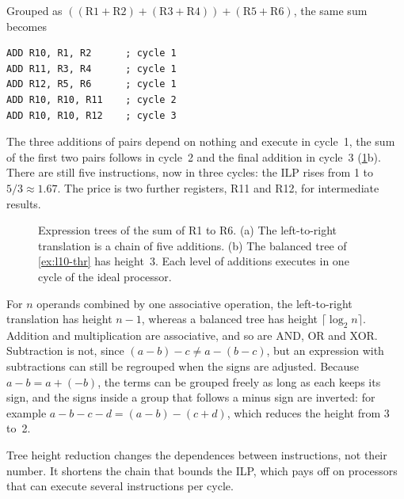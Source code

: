 \documentclass[../main.tex]{subfiles}
\begin{document}
\begin{example}
  \label{ex:l10-thr}
  Grouped as $((\text{R1}+\text{R2}) + (\text{R3}+\text{R4})) +
  (\text{R5}+\text{R6})$, the same sum becomes
  \begin{lstlisting}[language={[x86masm]Assembler}, numbers=none]
ADD R10, R1, R2      ; cycle 1
ADD R11, R3, R4      ; cycle 1
ADD R12, R5, R6      ; cycle 1
ADD R10, R10, R11    ; cycle 2
ADD R10, R10, R12    ; cycle 3
\end{lstlisting}
  The three additions of pairs depend on nothing and execute in cycle~1, the
  sum of the first two pairs follows in cycle~2 and the final addition in
  cycle~3 (\cref{fig:l10-tree-height}b).  There are still five instructions,
  now in three cycles: the ILP rises from 1 to $5/3 \approx 1.67$.  The price
  is two further registers, R11 and R12, for intermediate
  results.
\end{example}

\begin{figure}[htbp]
  \centering
  
  \caption{Expression trees of the sum of R1 to R6.  (a) The left-to-right
    translation is a chain of five additions.  (b) The balanced tree of
    \cref{ex:l10-thr} has height~3.  Each level of additions executes in one
    cycle of the ideal processor.}
  \label{fig:l10-tree-height}
\end{figure}

For $n$ operands combined by one associative operation, the left-to-right
translation has height $n-1$, whereas a balanced tree has height $\lceil
\log_2 n \rceil$.  Addition and multiplication are associative, and so are
AND, OR and XOR.  Subtraction is not, since $(a-b)-c \ne
a-(b-c)$, but an
expression with subtractions can still be regrouped when the signs are
adjusted.  Because $a - b = a + (-b)$, the terms can be grouped freely as long
as each keeps its sign, and the signs inside a group that follows a minus sign
are inverted: for example $a-b-c-d = (a-b)-(c+d)$, which reduces the height
from 3 to~2.

\begin{keypoint}
  Tree height reduction changes the dependences between instructions, not
  their number.  It shortens the chain that bounds the ILP, which pays off on
  processors that can execute several instructions per cycle.
\end{keypoint}
\end{document}
